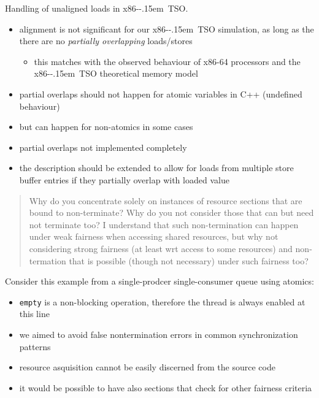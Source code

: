 \documentclass[aspectratio=169, fi]{paradise-slide}
\newcommand{\xtso}{\mbox{x86-\kern-.15em TSO}\xspace}
\newcommand{\rquote}[1]{\begin{quote}#1\end{quote}\bigskip\setlength{\leftmargini}{1em}}
\begin{document}
\begin{frame}[noframenumbering]{\qtitle}
  Handling of unaligned loads in \xtso.\bigskip

  \begin{itemize}
    \item alignment is not significant for our \xtso simulation, as long as the there are no
      \emph{partially overlapping} loads/stores
      \begin{itemize}
        \item this matches with the observed behaviour of x86-64 processors and the \xtso
          theoretical memory model
      \end{itemize}
    \item partial overlaps should not happen for atomic variables in C++ (undefined behaviour)
    \item but can happen for non-atomics in some cases
    \bigskip
    \item partial overlaps not implemented completely
    \item the description should be extended to allow for loads from multiple store buffer entries
      if they partially overlap with loaded value
  \end{itemize}
\end{frame}

\begin{frame}{\qtitle}
  \rquote{Why do you concentrate solely on instances of resource sections that are bound to
    non-terminate? Why do you not consider those that can but need not terminate too? I understand
    that such non-termination can happen under weak fairness when accessing shared resources, but
    why not considering strong fairness (at least wrt access to some resources) and non-termation
    that is possible (though not necessary) under such fairness too?}

  Consider this example from a single-prodcer single-consumer queue using atomics:
  \begin{cppcode}
    T &front() {
        while ( empty() ) { /* wait */ }
        // ...
  \end{cppcode}
  \begin{itemize}
    \item \texttt{empty} is a non-blocking operation, therefore the thread is always enabled at this line
    \item we aimed to avoid false nontermination errors in common synchronization patterns
    \item resource asquisition cannot be easily discerned from the source code
    \item it would be possible to have also sections that check for other fairness criteria
  \end{itemize}
\end{frame}
\end{document}
